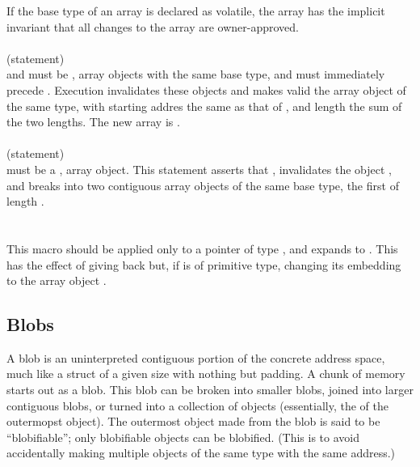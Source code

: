 \documentclass[preprint,nocopyrightspace]{sigplanconf}
\begin{document}
{{{{If the base type of an array is declared as volatile, the array has
the implicit invariant that all changes to the array are
owner-approved.
\\\\
 (statement)\\
 and  must be \vcc{\mutable}, \vcc{\writable} array objects with the same
base type, and  must immediately precede . Execution 
invalidates these objects and makes valid the array object of the same
type, with starting addres the same as that of , and length
the sum of the two lengths. The new array is \vcc{\mutable}.
\\\\
 (statement)\\
 must be a \vcc{\mutable}, \vcc{\writable} array object. This
statement asserts that , invalidates the
object , and breaks  into two \vcc{\mutable} contiguous array
objects of the same base type, the first of length .
\\\\
\\
This macro should be applied only to a pointer  of type , and
expands to . This has the effect of giving
back  but, if  is of primitive type, changing its
embedding to the array object . 

\subsection{Blobs}
A blob is an uninterpreted contiguous portion of the concrete address
space, much like a struct of a given size with nothing but padding. 
A chunk of memory starts out as a blob. This blob can be broken into
smaller blobs, joined into larger contiguous blobs, or turned into a
collection of objects (essentially, the  of the outermopst
object). The outermost object made from the blob is said to be
``blobifiable''; only blobifiable objects can be blobified. (This is
to avoid accidentally making multiple objects of the same type with
the same address.) 

}}}}
\end{document}
